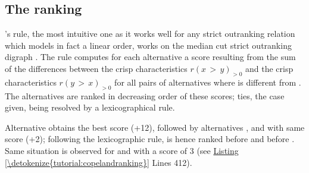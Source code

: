 \documentclass[a4paper,12pt,english]{sphinxhowto}
\begin{document}
\subsection{The  ranking}
\label{\detokenize{tutorial:the-copeland-ranking}}
’s rule, the most intuitive one as it works well for any strict outranking relation which models in fact a linear order, works on the median cut strict outranking digraph . The rule computes for each alternative a score resulting from the sum of the differences between the crisp  characteristics \(r(x\, > \,y)_{>0}\) and the crisp  characteristics \(r(y\, > \, x)_{>0}\)  for all pairs of alternatives where  is different from . The alternatives are ranked in decreasing order of these  scores; ties, the case given, being resolved by a lexicographical rule.
\def\sphinxLiteralBlockLabel{\label{\detokenize{tutorial:copelandranking}}}
\begin{sphinxVerbatim}[commandchars=\\\{\},numbers=left,firstnumber=1,stepnumber=1]
   
  
\end{sphinxVerbatim}

Alternative  obtains the best  score (+12), followed by alternatives ,  and  with same score (+2); following the lexicographic rule,  is hence ranked before  and  before . Same situation is observed for  and  with a score of \sphinxhyphen{}3 (see \hyperref[\detokenize{tutorial:copelandranking}]{Listing \ref{\detokenize{tutorial:copelandranking}}} Lines 4\sphinxhyphen{}12).
\end{document}
